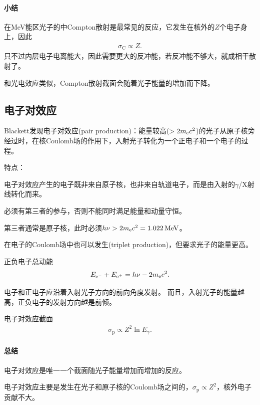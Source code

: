 \paragraph{小结}在MeV能区光子的中Compton散射是最常见的反应，它发生在核外的$Z$个电子身上，因此
\begin{align}
	\sigma_\mathrm C\propto Z.
\end{align}
只不过内层电子电离能大，因此需要更大的反冲能，若反冲能不够大，就成相干散射了。

和光电效应类似，Compton散射截面会随着光子能量的增加而下降。

\subsection{电子对效应}

Blackett发现电子对效应(pair production)：能量较高($>2m_\mathrm e c^2$)的光子从原子核旁经过时，在核Coulomb场的作用下，入射光子转化为一个正电子和一个电子的过程。

特点：
\begin{compactenum}
	\item 电子对效应产生的电子既非来自原子核，也非来自轨道电子，而是由入射的$\gamma$/X射线转化而来。
	\item 必须有第三者的参与，否则不能同时满足能量和动量守恒。
	\item 第三者通常是原子核，此时必须$h\nu>2m_\mathrm e c^2=\SI{1.022}{MeV}$。
	\item 在电子的Coulomb场中也可以发生(triplet production)，但要求光子的能量更高。
\end{compactenum}

正负电子总动能
\begin{align}
	E_{\mathrm e^-}+E_{\mathrm e^+}=h\nu-2m_{\mathrm e}c^2.
\end{align}

电子和正电子应沿着入射光子方向的前向角度发射。
而且，入射光子的能量越高，正负电子的发射方向越是前倾。

电子对效应截面
\begin{align}
	\sigma_\mathrm p\propto Z^2\ln E_{\gamma}.
\end{align}
\paragraph{总结}
电子对效应是唯一一个截面随光子能量增加而增加的反应。%

电子对效应主要是发生在光子和原子核的Coulomb场之间的，$\sigma_\mathrm p\propto Z^2$，核外电子贡献不大。


